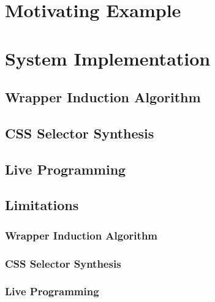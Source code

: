 \documentclass[sigconf,10pt]{acmart}
\begin{document}
\hypertarget{sec:demos}{%
\section{Motivating Example}\label{sec:demos}}

\hypertarget{sec:implementation}{%
\section{System Implementation}\label{sec:implementation}}

\hypertarget{wrapper-induction-algorithm}{%
\subsection{Wrapper Induction
Algorithm}\label{wrapper-induction-algorithm}}

\hypertarget{css-selector-synthesis}{%
\subsection{CSS Selector Synthesis}\label{css-selector-synthesis}}

\hypertarget{live-programming}{%
\subsection{Live Programming}\label{live-programming}}

\hypertarget{limitations}{%
\subsection{Limitations}\label{limitations}}

\hypertarget{wrapper-induction-algorithm-1}{%
\subsubsection{Wrapper Induction
Algorithm}\label{wrapper-induction-algorithm-1}}

\hypertarget{css-selector-synthesis-1}{%
\subsubsection{CSS Selector Synthesis}\label{css-selector-synthesis-1}}

\hypertarget{live-programming-1}{%
\subsubsection{Live Programming}\label{live-programming-1}}
\end{document}
